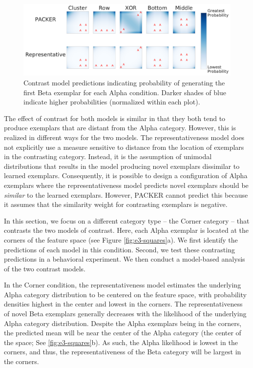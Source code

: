 \documentclass[pdflatex,sn-apa]{sn-jnl}%
\theoremstyle{thmstyleone}%
\theoremstyle{thmstyletwo}%
\theoremstyle{thmstylethree}%
\begin{document}
\begin{figure}[p]
    \begin{center} 
      \includegraphics[width=\textwidth]{figs/firstbetas.pdf}
      \caption{Contrast model predictions indicating probability of generating
        the first Beta exemplar for each Alpha condition. Darker shades of
        blue indicate higher probabilities (normalized within each plot).}
      \label{fig:firstbetas}
    \end{center}
\end{figure}

The effect of contrast for both models is similar in that they both tend to
produce exemplars that are distant from the Alpha category. However, this is
realized in different ways for the two models. The representativeness model does
not explicitly use a measure sensitive to distance from the location of
exemplars in the contrasting category. Instead, it is the assumption of unimodal
distributions that results in the model producing novel exemplars dissimilar to
learned exemplars. Consequently, it is possible to design a configuration of
Alpha exemplars where the representativeness model predicts novel exemplars
should be \emph{similar} to the learned exemplars. However, PACKER cannot
predict this because it assumes that the similarity weight for contrasting
exemplars is negative.

In this section, we focus on a different category type -- the Corner category --
that contrasts the two models of contrast. Here, each Alpha exemplar is located
at the corners of the feature space (see Figure \ref{fig:e3-squares}a). We first
identify the predictions of each model in this condition. Second, we test these
contrasting predictions in a behavioral experiment. We then conduct a
model-based analysis of the two contrast models.

In the Corner condition, the representativeness model estimates the underlying Alpha category distribution to be
centered on the feature space, with probability densities highest in the center and lowest in the corners. The
representativeness of novel Beta exemplars generally decreases with the likelihood of the underlying Alpha category
distribution. Despite the Alpha exemplars being in the corners, the predicted mean will be near the center
of the Alpha category (the center of the space; See \ref{fig:e3-squares}b). As such, the Alpha likelihood is lowest in
the corners, and thus, the representativeness of the Beta category will be largest in the corners.
\end{document}
